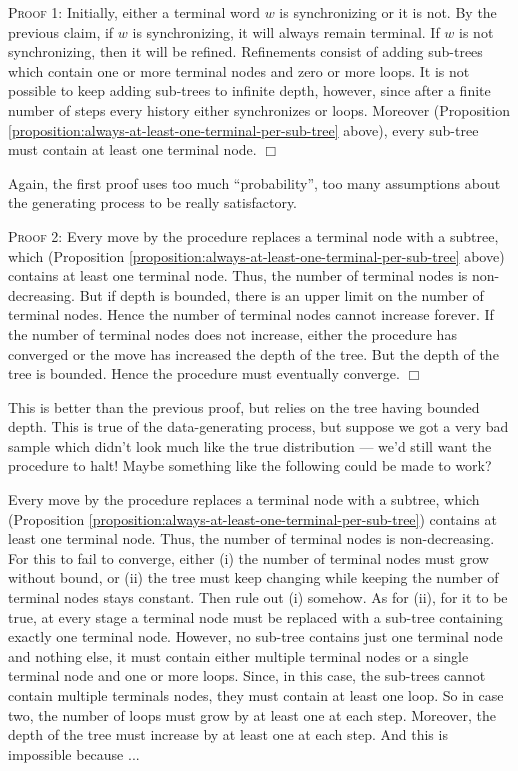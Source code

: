 \documentclass[../new-procedure.tex]{subfiles}
\begin{document}
\textsc{Proof 1:} Initially, either a terminal word $w$ is synchronizing or it
is not.  By the previous claim, if $w$ is synchronizing, it will always remain
terminal.  If $w$ is not synchronizing, then it will be refined.  Refinements
consist of adding sub-trees which contain one or more terminal nodes and zero
or more loops.  It is not possible to keep adding sub-trees to infinite depth,
however, since after a finite number of steps every history either synchronizes
or loops.  Moreover (Proposition
\ref{proposition:always-at-least-one-terminal-per-sub-tree} above), every
sub-tree must contain at least one terminal node. $\Box$

Again, the first proof uses too much ``probability'', too many assumptions
about the generating process to be really satisfactory.



\textsc{Proof 2:} Every move by the procedure replaces a terminal node with a
subtree, which (Proposition
\ref{proposition:always-at-least-one-terminal-per-sub-tree} above) contains at
least one terminal node.  Thus, the number of terminal nodes is non-decreasing.
But if depth is bounded, there is an upper limit on the number of terminal
nodes.  Hence the number of terminal nodes cannot increase forever.  If the
number of terminal nodes does not increase, either the procedure has converged
or the move has increased the depth of the tree.  But the depth of the tree is
bounded.  Hence the procedure must eventually converge.  $\Box$

This is better than the previous proof, but relies on the tree having bounded
depth.  This is true of the data-generating process, but suppose we got a very
bad sample which didn't look much like the true distribution --- we'd still
want the procedure to halt!  Maybe something like the following could be made
to work?

Every move by the procedure replaces a terminal node with a subtree, which
(Proposition \ref{proposition:always-at-least-one-terminal-per-sub-tree})
contains at least one terminal node.  Thus, the number of terminal nodes is
non-decreasing.  For this to fail to converge, either (i) the number of
terminal nodes must grow without bound, or (ii) the tree must keep changing
while keeping the number of terminal nodes stays constant.  Then rule out (i)
somehow.  As for (ii), for it to be true, at every stage a terminal node must
be replaced with a sub-tree containing exactly one terminal node.  However, no
sub-tree contains just one terminal node and nothing else, it must contain
either multiple terminal nodes or a single terminal node and one or more loops.
Since, in this case, the sub-trees cannot contain multiple terminals nodes,
they must contain at least one loop.  So in case two, the number of loops must
grow by at least one at each step.  Moreover, the depth of the tree must
increase by at least one at each step.  And this is impossible because ...
\end{document}
